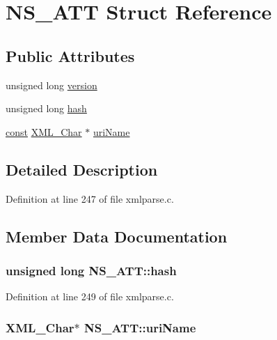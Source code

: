 \hypertarget{struct_n_s___a_t_t}{}\section{N\+S\+\_\+\+A\+TT Struct Reference}
\label{struct_n_s___a_t_t}
\subsection*{Public Attributes}
\begin{DoxyCompactItemize}
\item 
unsigned long \hyperlink{struct_n_s___a_t_t_a796133bdb5abab6c3b0b34aa2bd942bf}{version}
\item 
unsigned long \hyperlink{struct_n_s___a_t_t_a81ad0dc7776ab2882cefcbaaf0de7f5d}{hash}
\item 
\hyperlink{getopt1_8c_a2c212835823e3c54a8ab6d95c652660e}{const} \hyperlink{amiga_2include_2libraries_2expat_8h_a63da96463e775e1ec3a7d1f076208127}{X\+M\+L\+\_\+\+Char} $\ast$ \hyperlink{struct_n_s___a_t_t_a4f14701c7caace1c0a90e6167ff55836}{uri\+Name}
\end{DoxyCompactItemize}


\subsection{Detailed Description}


Definition at line 247 of file xmlparse.\+c.



\subsection{Member Data Documentation}
\subsubsection[{\texorpdfstring{hash}{hash}}]{\setlength{\rightskip}{0pt plus 5cm}unsigned long N\+S\+\_\+\+A\+T\+T\+::hash}\hypertarget{struct_n_s___a_t_t_a81ad0dc7776ab2882cefcbaaf0de7f5d}{}\label{struct_n_s___a_t_t_a81ad0dc7776ab2882cefcbaaf0de7f5d}


Definition at line 249 of file xmlparse.\+c.

\subsubsection[{\texorpdfstring{uri\+Name}{uriName}}]{ {\bf X\+M\+L\+\_\+\+Char}$\ast$ N\+S\+\_\+\+A\+T\+T\+::uri\+Name}\hypertarget{struct_n_s___a_t_t_a4f14701c7caace1c0a90e6167ff55836}{}\label{struct_n_s___a_t_t_a4f14701c7caace1c0a90e6167ff55836}


